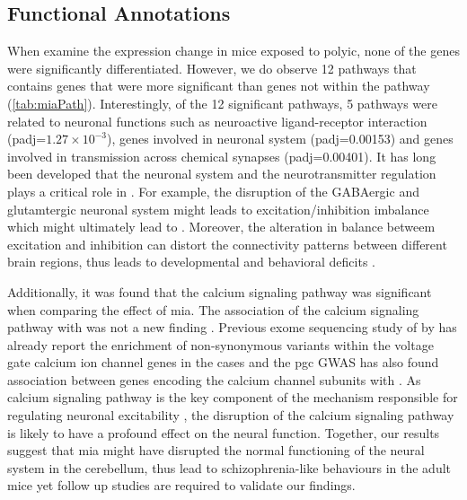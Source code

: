 \subsection{Functional Annotations}
When examine the expression change in mice exposed to \gls{polyic}, none of the genes were significantly differentiated. 
However, we do observe 12 pathways that contains genes that were more significant than genes not within the pathway (\cref{tab:miaPath}).
Interestingly, of the 12 significant pathways, 5 pathways were related to neuronal functions such as neuroactive ligand-receptor interaction (padj=$1.27\times 10^{-3}$), genes involved in neuronal system (padj=0.00153) and genes involved in transmission across chemical synapses (padj=0.00401).
It has long been developed that the neuronal system and the neurotransmitter regulation plays a critical role in .
For example, the disruption of the GABAergic and glutamtergic neuronal system might leads to excitation/inhibition imbalance which might ultimately lead to  \citep{Wassef2003}.
Moreover, the alteration in balance betweem excitation and inhibition can distort the connectivity patterns between different brain regions, thus leads to developmental and behavioral deficits \citep{Cline2005}.

Additionally, it was found that the calcium signaling pathway was significant when comparing the effect of \gls{mia}. 
The association of the calcium signaling pathway with  was not a new finding \citep{Lidow2003,Purcell2014,Ripke2014}.
Previous exome sequencing study of  by \citet{Purcell2014} has already report the enrichment of non-synonymous variants within the voltage gate calcium ion channel genes in the  cases and the \gls{pgc}  \gls{GWAS} has also found association between genes encoding the calcium channel subunits with .
As calcium signaling pathway is the key component of the mechanism responsible for regulating neuronal excitability \citep{Berridge2014}, the disruption of the calcium signaling pathway is likely to have a profound effect on the neural function. 
Together, our results suggest that \gls{mia} might have disrupted the normal functioning of the neural system in the cerebellum, thus lead to schizophrenia-like behaviours in the adult mice yet follow up studies are required to validate our findings.

